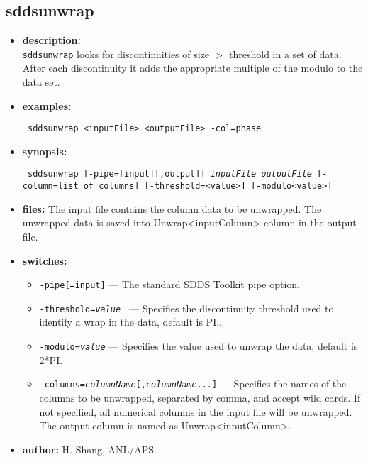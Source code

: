 \newpage 
\subsection{sddsunwrap} 
\label{sddsunwrap} 
 
\begin{itemize} 
\item {\bf description:} \hspace*{1mm}\\ 
{\tt sddsunwrap} looks for discontinuities of size $>$ threshold in a set of data. After each discontinuity it adds the appropriate multiple of the modulo to the data set.
\item {\bf examples:} 
\begin{flushleft}{\tt
   sddsunwrap <inputFile> <outputFile> -col=phase
}\end{flushleft} 
\item {\bf synopsis:}  
\begin{flushleft}{\tt 
sddsunwrap [-pipe=[input][,output]] {\em inputFile} {\em outputFile}
      [-column=list of columns] [-threshold=<value>] [-modulo<value>]
}\end{flushleft} 
\item {\bf files:} 
The input file contains the column data to be unwrapped. The unwrapped data is saved into Unwrap<inputColumn> column in the output file.
\item {\bf switches:} 
    \begin{itemize} 
    \item {\tt -pipe[=input]} --- The standard SDDS Toolkit pipe option. 
    \item {\tt -threshold={\em value} } --- Specifies the discontinuity threshold used to identify a wrap in the data, default is PI..
    \item {\tt -modulo={\em value}} --- Specifies the value used to unwrap the data, default is 2*PI.
    \item {\tt -columns={\em columnName}[,{\em columnName}...]} ---  
        Specifies the names of the columns to be unwrapped, separated by comma, and accept wild cards. If not specified, all numerical
        columns in the input file will be unwrapped. The output column is named as Unwrap<inputColumn>.
    \end{itemize} 

\item {\bf author:} H. Shang, ANL/APS. 
\end{itemize} 
 
